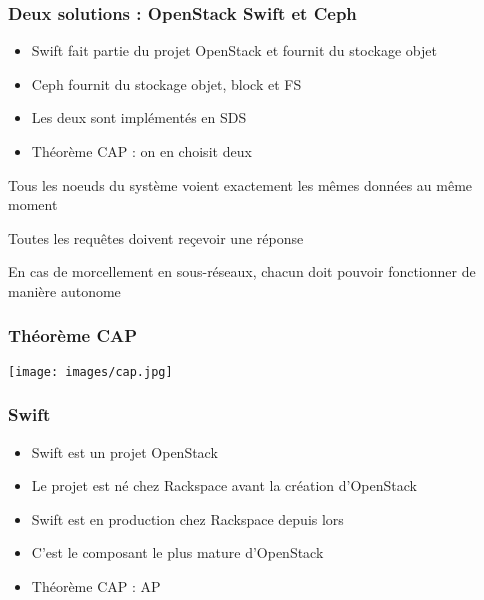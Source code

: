   \begin{frame}
    \frametitle{Deux solutions : OpenStack Swift et Ceph}
    \begin{itemize}
      \item Swift fait partie du projet OpenStack et fournit du stockage objet
      \item Ceph fournit du stockage objet, block et FS
      \item Les deux sont implémentés en SDS\pause
      \item Théorème CAP : on en choisit deux
    \end{itemize}
    \begin{description}
        \item[Consistancy] Tous les noeuds du système voient exactement les mêmes données au même moment
        \item[Availability] Toutes les requêtes doivent reçevoir une réponse
        \item[Partition Tolerance] En cas de morcellement en sous-réseaux, chacun doit pouvoir fonctionner de manière autonome
    \end{description}
  \end{frame}

  \begin{frame}
  \frametitle{Théorème CAP}
  \texttt{[image: images/cap.jpg]}
  \end{frame}

  \begin{frame}
  \frametitle{Swift}
    \begin{itemize}
      \item Swift est un projet OpenStack
      \item Le projet est né chez Rackspace avant la création d'OpenStack
      \item Swift est en production chez Rackspace depuis lors
      \item C'est le composant le plus mature d'OpenStack
      \item Théorème CAP : AP
    \end{itemize}
  \end{frame}

